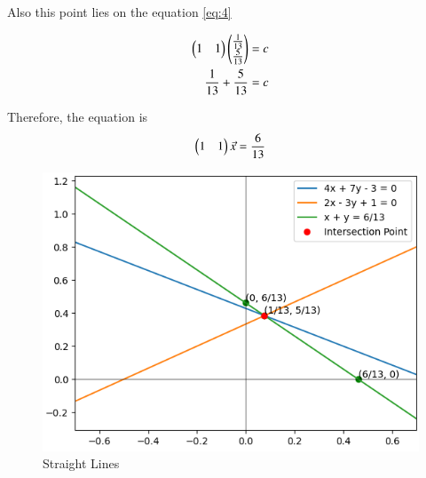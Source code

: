 \documentclass[12pt]{article}
\begin{document}
\begin{enumerate}
Also this point lies on the equation \eqref{eq:4}\\
\begin{center}
\begin{align}
    \begin{pmatrix}1 & 1\end{pmatrix}\begin{pmatrix}\frac{1}{13}\\\frac{5}{13}\end{pmatrix} = c\\
    \frac{1}{13}+\frac{5}{13} = c
    \end{align}
    \end{center}
    Therefore, the equation is \begin{align}
        \begin{pmatrix}1&1\end{pmatrix}\Vec{x}=\frac{6}{13}
    \end{align}
\begin{figure}[h]
    \centering
    \includegraphics[width=\columnwidth]{figs/straightline.png}
    \caption{Straight Lines}
    \label{fig:enter-label}
\end{figure}
\end{enumerate}
\end{document}
